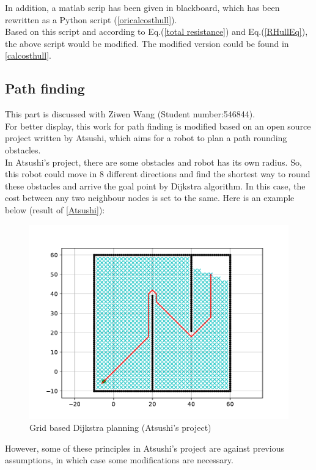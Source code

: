 \noindent In addition, a matlab scrip has been given in blackboard, which has been rewritten as a Python script (\autoref{oricalcosthull}).
\\Based on this script and according to Eq.(\ref{total resistance}) and Eq.(\ref{RHullEq}), the above script would be modified. The modified version could be found in \autoref{calcosthull}.
\subsection{Path finding}
\label{Pathfinding}
This part is discussed with Ziwen Wang (Student number:546844).
\\For better display, this work for path finding is modified based on an open source project written by Atsushi, which aims for a robot to plan a path rounding obstacles. 
\\In Atsushi's project, there are some obstacles and robot has its own radius. So, this robot could move in 8 different directions and find the shortest way to round these obstacles and arrive the goal point by Dijkstra algorithm. In this case, the cost between any two neighbour nodes is set to the same. Here is an example below (result of \autoref{Atsushi}):
\begin{figure}[H]
    \centering  
	\includegraphics[width=0.9\linewidth]{OriginDijkstra.pdf}  
	\caption{Grid based Dijkstra planning (Atsushi's project)}
\end{figure}
\noindent However, some of these principles in Atsushi's project are against previous assumptions, in which case some modifications are necessary. 
